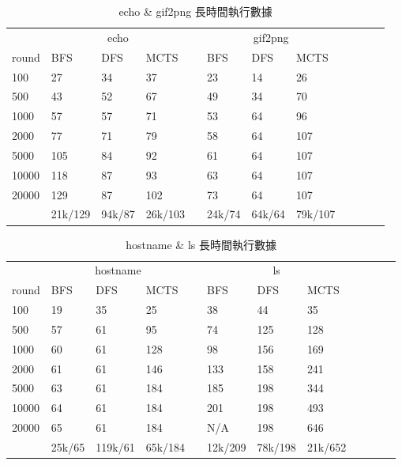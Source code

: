 \documentclass[12pt,a4paper,oneside]{book}
\begin{document}
\begin{appendices}
\begin{table}[htbp]
\centering
\caption{echo \& gif2png 長時間執行數據}
\label{testMethodC}
\begin{tabular}{@{}llllllllllll@{}} \toprule
             & \multicolumn{3}{c}{echo} & \phantom{abc} & \multicolumn{3}{c}{gif2png} \\ \cmidrule{2-4} \cmidrule{6-8}
round      & BFS   & DFS  & MCTS & & BFS   & DFS & MCTS     \\ \midrule
100        & 27    & 34   & 37   & & 23    & 14  & 26       \\
500        & 43    & 52   & 67   & & 49    & 34  & 70       \\
1000       & 57    & 57   & 71   & & 53    & 64  & 96       \\
2000       & 77    & 71   & 79   & & 58    & 64  & 107      \\
5000       & 105   & 84   & 92   & & 61    & 64  & 107      \\
10000      & 118   & 87   & 93   & & 63    & 64  & 107      \\
20000      & 129   & 87   & 102  & & 73    & 64  & 107      \\
& 21k/129 & 94k/87 & 26k/103 & & 24k/74 & 64k/64 & 79k/107  \\ \bottomrule
\end{tabular}
\end{table}

\begin{table}[htbp]
\centering
\caption{hostname \& ls 長時間執行數據}
\label{testMethodC}
\begin{tabular}{@{}llllllllllll@{}} \toprule
             & \multicolumn{3}{c}{hostname} & \phantom{abc} & \multicolumn{3}{c}{ls} \\ \cmidrule{2-4} \cmidrule{6-8}
round      & BFS   & DFS  & MCTS & & BFS   & DFS & MCTS     \\ \midrule
100        & 19    & 35   & 25   & & 38    & 44  & 35       \\
500        & 57    & 61   & 95   & & 74    & 125 & 128      \\
1000       & 60    & 61   & 128  & & 98    & 156 & 169      \\
2000       & 61    & 61   & 146  & & 133   & 158 & 241      \\
5000       & 63    & 61   & 184  & & 185   & 198 & 344      \\
10000      & 64    & 61   & 184  & & 201   & 198 & 493      \\
20000      & 65    & 61   & 184  & & N/A   & 198 & 646      \\ 
& 25k/65 & 119k/61 & 65k/184 & & 12k/209 & 78k/198 & 21k/652 \\ \bottomrule
\end{tabular}
\end{table}


\end{appendices}
\end{document}
